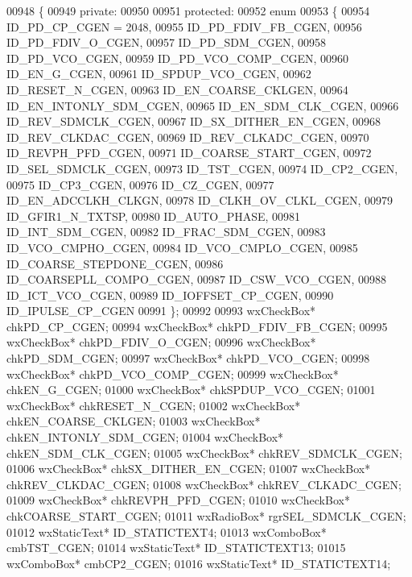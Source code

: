 \begin{DoxyCode}
00948 \{
00949     \textcolor{keyword}{private}:
00950     
00951     \textcolor{keyword}{protected}:
00952         \textcolor{keyword}{enum}
00953         \{
00954             ID\_PD\_CP\_CGEN = 2048,
00955             ID_PD_FDIV_FB_CGEN,
00956             ID_PD_FDIV_O_CGEN,
00957             ID_PD_SDM_CGEN,
00958             ID_PD_VCO_CGEN,
00959             ID_PD_VCO_COMP_CGEN,
00960             ID_EN_G_CGEN,
00961             ID_SPDUP_VCO_CGEN,
00962             ID_RESET_N_CGEN,
00963             ID_EN_COARSE_CKLGEN,
00964             ID_EN_INTONLY_SDM_CGEN,
00965             ID_EN_SDM_CLK_CGEN,
00966             ID_REV_SDMCLK_CGEN,
00967             ID_SX_DITHER_EN_CGEN,
00968             ID_REV_CLKDAC_CGEN,
00969             ID_REV_CLKADC_CGEN,
00970             ID_REVPH_PFD_CGEN,
00971             ID_COARSE_START_CGEN,
00972             ID_SEL_SDMCLK_CGEN,
00973             ID_TST_CGEN,
00974             ID_CP2_CGEN,
00975             ID_CP3_CGEN,
00976             ID_CZ_CGEN,
00977             ID_EN_ADCCLKH_CLKGN,
00978             ID_CLKH_OV_CLKL_CGEN,
00979             ID_GFIR1_N_TXTSP,
00980             ID_AUTO_PHASE,
00981             ID_INT_SDM_CGEN,
00982             ID_FRAC_SDM_CGEN,
00983             ID_VCO_CMPHO_CGEN,
00984             ID_VCO_CMPLO_CGEN,
00985             ID_COARSE_STEPDONE_CGEN,
00986             ID_COARSEPLL_COMPO_CGEN,
00987             ID_CSW_VCO_CGEN,
00988             ID_ICT_VCO_CGEN,
00989             ID_IOFFSET_CP_CGEN,
00990             ID\_IPULSE\_CP\_CGEN
00991         \};
00992         
00993         wxCheckBox* chkPD_CP_CGEN;
00994         wxCheckBox* chkPD_FDIV_FB_CGEN;
00995         wxCheckBox* chkPD_FDIV_O_CGEN;
00996         wxCheckBox* chkPD_SDM_CGEN;
00997         wxCheckBox* chkPD_VCO_CGEN;
00998         wxCheckBox* chkPD_VCO_COMP_CGEN;
00999         wxCheckBox* chkEN_G_CGEN;
01000         wxCheckBox* chkSPDUP_VCO_CGEN;
01001         wxCheckBox* chkRESET_N_CGEN;
01002         wxCheckBox* chkEN_COARSE_CKLGEN;
01003         wxCheckBox* chkEN_INTONLY_SDM_CGEN;
01004         wxCheckBox* chkEN_SDM_CLK_CGEN;
01005         wxCheckBox* chkREV_SDMCLK_CGEN;
01006         wxCheckBox* chkSX_DITHER_EN_CGEN;
01007         wxCheckBox* chkREV_CLKDAC_CGEN;
01008         wxCheckBox* chkREV_CLKADC_CGEN;
01009         wxCheckBox* chkREVPH_PFD_CGEN;
01010         wxCheckBox* chkCOARSE_START_CGEN;
01011         wxRadioBox* rgrSEL_SDMCLK_CGEN;
01012         wxStaticText* ID_STATICTEXT4;
01013         wxComboBox* cmbTST_CGEN;
01014         wxStaticText* ID_STATICTEXT13;
01015         wxComboBox* cmbCP2_CGEN;
01016         wxStaticText* ID_STATICTEXT14;

\end{DoxyCode}
